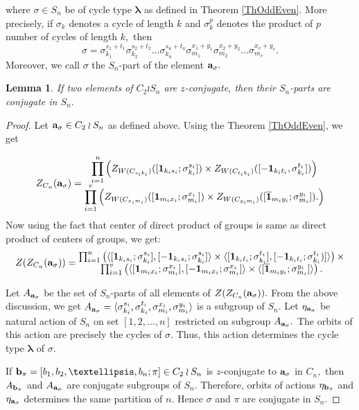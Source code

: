 \documentclass[12pt,twoside,reqno]{amsart}
\newtheorem{lemma}[theorem]{Lemma}
\theoremstyle{definition}
\numberwithin{equation}{section}
\newcommand{\bmf}[1]{\mathbf{#1}}
\newcommand{\Lbd}{\bm {\lambda}}
\begin{document}
where $\sigma \in S_n$ be of cycle type $\Lbd$ as defined in Theorem \ref{ThOddEven}.
More precisely, if $\sigma_k$ denotes a cycle of length $k$ and $\sigma_k^p$ denotes the product of $p$ number of cycles of length $k,$ then 
 $$ \sigma = \sigma_{k_1}^{s_1+t_1} \sigma_{k_2}^{s_2+t_2}\dots \sigma_{k_u}^{s_u+t_u} \sigma_{m_1}^{x_1+y_1}\sigma_{m_2}^{x_2+y_2}\dots \sigma_{m_v}^{x_v+y_v}.$$  
Moreover, we call $\sigma$ the $S_n$-part of the element ${\bf a}_\sigma.$ 

\begin{lemma}\label{S_n-parts}
    If two elements of $C_2 \wr S_n$ are $z$-conjugate, then their $S_n$-parts are conjugate in $S_n.$
\end{lemma}
\begin{proof}
Let ${\bf a}_\sigma\in C_2 \wr S_n$ as defined above.
Using the Theorem \ref{ThOddEven}, we get 


$$ Z_{C_n}(\bmf{a}_\sigma)= \begin{matrix}
                                \displaystyle\prod_{i=1}^u \left(Z_{W(C_{s_ik_i})}([{\bf 1}_{k_i s_i}; \sigma_{k_i}^{s_i}])\times Z_{W(C_{t_ik_i})}([ {\bf -1}_{k_it_i}, \sigma_{k_i}^{t_i}]) \right)\\
                                \displaystyle\prod_{i=1}^v \left( Z_{W(C_{x_im_i})}( [{\bf 1}_{m_ix_i}; \sigma_{m_i}^{x_i}])\times Z_{W(C_{y_im_i})}( [\bmf{\overline{1}}_{m_iy_i};\sigma_{m_i}^{y_i}]).\right)
                               \end{matrix}$$ 
 Now using the fact that center of direct product of groups is same as direct product of centers of groups, we get:
$$Z(Z_{C_n}({\bf a}_\sigma))= \begin{matrix}
 \prod_{i=1}^u\left( \langle [{\bf 1}_{k_is_i}; \sigma_{k_i}^{s_i}],  [ {\bf -1}_{k_is_i}; \sigma_{k_i}^{s_i}] \rangle \times  \langle [ {\bf 1}_{k_it_i}; \sigma_{k_i}^{t_i}], [{\bf -1}_{k_it_i}; \sigma_{k_i}^{t_i})] \rangle\right) \times \\ \prod_{i=1}^v \left(\langle [{\bf 1}_{m_ix_i}; \sigma_{m_i}^{x_i}], [ {\bf -1}_{m_ix_i}; \sigma_{m_i}^{x_i}]\rangle \times \langle [{ \bf \overline{1}}_{m_iy_i};\sigma_{m_i}^{y_i}] \rangle\right). \end{matrix}$$ 
 
 Let $A_{{\bf a}_\sigma}$ be the set of $S_n$-parts of all elements of $Z(Z_{C_n}({\bf a}_\sigma)).$ From the above discussion, we get  $A_{{\bf a}_\sigma} = \langle \sigma_{k_i}^{s_i}, \sigma_{k_i}^{t_i}, \sigma_{m_i}^{x_i}, \sigma_{m_i}^{y_i} \rangle$ is a subgroup of $S_n.$ Let $\eta_{{\bf a}_\sigma}$ be natural action of $S_n$ on set $[1,2,\dots, n]$ restricted on subgroup $A_{{\bf a}_\sigma}.$ The orbits of this action are precisely the cycles of $\sigma.$ Thus, this action determines the cycle type $\Lbd$ of $\sigma.$ 
 
 If ${\bf b}_\pi=[b_1, b_2, \dots, b_n; \pi] \in C_2 \wr S_n$ is $z$-conjugate to ${\bf a}_\sigma$ in $C_n,$ then $A_{{\bf b}_\pi}$ and $A_{{\bf a}_\sigma}$ are conjugate subgroups of $S_n.$ Therefore, orbits of actions $\eta_{{\bf b}_\pi}$ and $\eta_{{\bf a}_\sigma}$ determines the same partition of $n.$ Hence $\sigma$ and $\pi$ are conjugate in $S_n.$

 
\end{proof}
\end{document}
